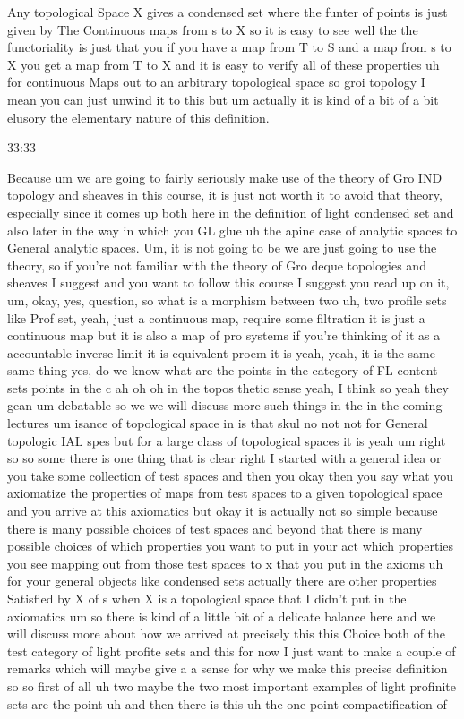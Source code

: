 \begin{example}
    
Any topological Space X gives a condensed set where the funter of points is just given by The Continuous maps from s to X so it is easy to see well the the functoriality is just that you if you have a map from T to S and a map from s to X you get a map from T to X and it is easy to verify all of these properties uh for continuous Maps out to an arbitrary topological space so groi topology I mean you can just unwind it to this but um actually it is kind of a bit of a bit elusory the elementary nature of this definition.
\end{example}
\begin{unfinished}{33:33}



Because um we are going to fairly seriously make use of the theory of Gro IND topology and sheaves in this course, it is just not worth it to avoid that theory, especially since it comes up both here in the definition of light condensed set and also later in the way in which you GL glue uh the apine case of analytic spaces to General analytic spaces. Um, it is not going to be we are just going to use the theory, so if you're not familiar with the theory of Gro deque topologies and sheaves I suggest and you want to follow this course I suggest you read up on it, um, okay, yes, question, so what is a morphism between two uh, two profile sets like Prof set, yeah, just a continuous map, require some filtration it is just a continuous map but it is also a map of pro systems if you're thinking of it as a accountable inverse limit it is equivalent proem it is yeah, yeah, it is the same same thing yes, do we know what are the points in the category of FL content sets points in the c ah oh oh in the topos thetic sense yeah, I think so yeah they gean um debatable so we we will discuss more such things in the in the coming lectures um isance of topological space in is that skul no not not for General topologic IAL spes but for a large class of topological spaces it is yeah um right so so some there is one thing that is clear right I started with a general idea or you take some collection of test spaces and then you okay then you say what you axiomatize the properties of maps from test spaces to a given topological space and you arrive at this axiomatics but okay it is actually not so simple because there is many possible choices of test spaces and beyond that there is many possible choices of which properties you want to put in your act which properties you see mapping out from those test spaces to x that you put in the axioms uh for your general objects like condensed sets actually there are other properties Satisfied by X of s when X is a topological space that I didn't put in the axiomatics um so there is kind of a little bit of a delicate balance here and we will discuss more about how we arrived at precisely this this Choice both of the test category of light profite sets and this for now I just want to make a couple of remarks which will maybe give a a sense for why we make this precise definition so so first of all uh two maybe the two most important examples of light profinite sets are the point uh and then there is this uh the one point compactification of 
\end{unfinished}
